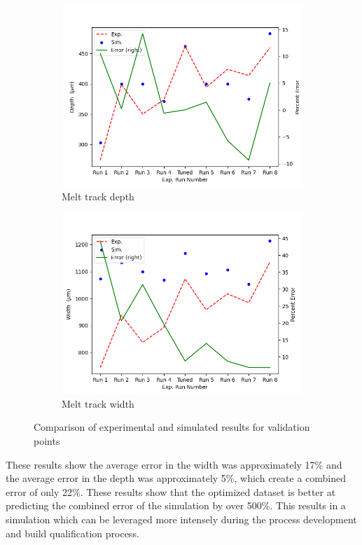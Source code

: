 \documentclass[pdflatex,sn-mathphys]{sn-jnl}
\begin{document}
	\begin{figure}[!htb]\centering
		\begin{subfigure}[c]{0.45\textwidth}\centering
		\includegraphics[width=\textwidth]{melt_track_val_depth}
		\caption{Melt track depth}
		\label{fig:melt_track_val_depth}
		\end{subfigure}\hfill{}
			\begin{subfigure}[c]{0.45\textwidth}\centering
			\includegraphics[width=\textwidth]{melt_track_val_width}
			\caption{Melt track width}
			\label{fig:melt_track_val_width}
			\end{subfigure}
		\caption{Comparison of experimental and simulated results for validation points}
		\label{fig:melt_track_val}
	\end{figure}
	These results show the average error in the width was approximately 17\% and the average error in the depth was approximately 5\%, which create a combined error of only 22\%.  These results show that the optimized dataset is better at predicting the combined error of the simulation by over 500\%.  This results in a simulation which can be leveraged more intensely during the process development and build qualification process.  
	\FloatBarrier
\end{document}
